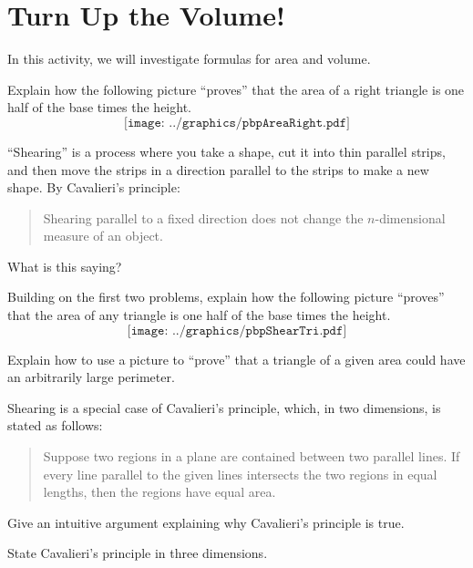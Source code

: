 \newpage
\section{Turn Up the Volume!}

In this activity, we will investigate formulas for area and
volume.


\begin{prob}
Explain how the following picture ``proves'' that the area of a right
  triangle is one half of the base times the height.
\[
\texttt{[image: ../graphics/pbpAreaRight.pdf]}
\]
\end{prob}

\begin{prob}
``Shearing'' is a process where you take a shape, cut it into thin parallel strips, 
and then move the strips in a direction parallel to the strips to make a new shape.  
By Cavalieri's principle:
\begin{quote}
Shearing parallel to a fixed direction does not change the $n$-dimensional measure of an object.
\end{quote}
What is this saying?
\end{prob}

\begin{prob}
Building on the first two problems, explain how the following picture
  ``proves'' that the area of any triangle is one half of the base times the
  height.
\[
\texttt{[image: ../graphics/pbpShearTri.pdf]}
\]
\end{prob}

\begin{prob}
Explain how to use a picture to ``prove'' that a triangle of a given
  area could have an arbitrarily large perimeter.
\end{prob}
\vspace{.25in}

\begin{prob}
Shearing is a special case of Cavalieri's principle, which, in two dimensions, is stated as follows:  
\begin{quote}
Suppose two regions in a plane are contained between two parallel lines.  If every line parallel to the given lines intersects the two regions in equal lengths, then the regions have equal area.  
\end{quote}
Give an intuitive argument explaining why Cavalieri's principle is true.
\end{prob}

\begin{prob}
State Cavalieri's principle in three dimensions.  
\end{prob}
\vspace{.25in}


